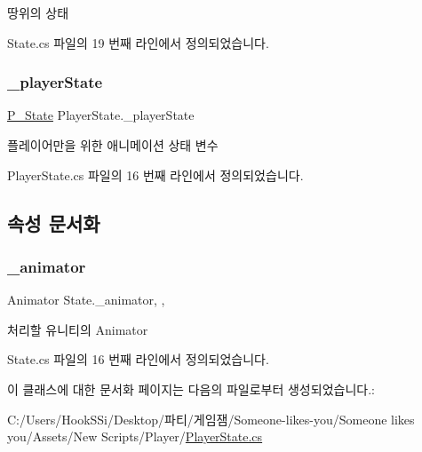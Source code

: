 땅위의 상태 



State.\+cs 파일의 19 번째 라인에서 정의되었습니다.

\mbox{\label{class_player_state_a9492a14c13c0dc523c37cb44d334ab68}} 
\subsubsection{\texorpdfstring{\_playerState}{\_playerState}}
{\footnotesize\ttfamily \mbox{\hyperlink{class_player_state_afe68f1a1529955d173ccd309da55001b}{P\+\_\+\+State}} Player\+State.\+\_\+player\+State}



플레이어만을 위한 애니메이션 상태 변수 



Player\+State.\+cs 파일의 16 번째 라인에서 정의되었습니다.



\subsection{속성 문서화}
\mbox{\label{class_state_aff1dd03a1b3c63053b23371d6d70cd1a}} 
\subsubsection{\texorpdfstring{\_animator}{\_animator}}
{\footnotesize\ttfamily Animator State.\+\_\+animator\hspace{0.3cm}{\ttfamily [get]}, {\ttfamily [set]}, {\ttfamily [inherited]}}



처리할 유니티의 Animator 



State.\+cs 파일의 16 번째 라인에서 정의되었습니다.


\begin{DoxyCode}{0}

\end{DoxyCode}


이 클래스에 대한 문서화 페이지는 다음의 파일로부터 생성되었습니다.\+:\begin{DoxyCompactItemize}
\item 
C\+:/\+Users/\+Hook\+S\+Si/\+Desktop/파티/게임잼/\+Someone-\/likes-\/you/\+Someone likes you/\+Assets/\+New Scripts/\+Player/\mbox{\hyperlink{_player_state_8cs}{Player\+State.\+cs}}\end{DoxyCompactItemize}
